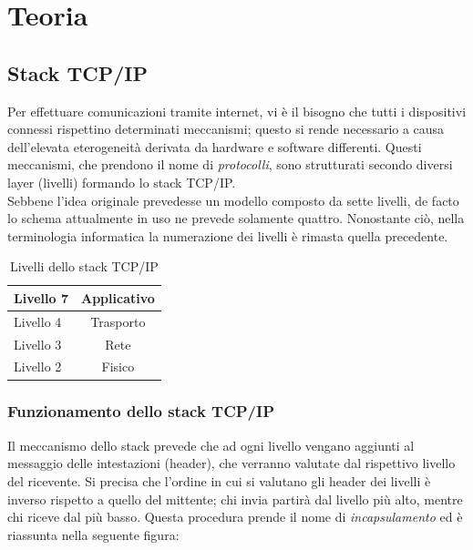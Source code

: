 \chapter{Teoria}

\section{Stack TCP/IP}
Per effettuare comunicazioni tramite internet, vi è il bisogno che tutti i dispositivi connessi rispettino determinati meccanismi; questo si rende necessario a causa dell'elevata eterogeneità derivata da hardware e software differenti.
Questi meccanismi, che prendono il nome di \textit{protocolli}, sono strutturati secondo diversi layer (livelli) formando lo stack TCP/IP.  \\
Sebbene l'idea originale prevedesse un modello composto da sette livelli, de facto lo schema attualmente in uso ne prevede solamente quattro. Nonostante ciò, nella terminologia informatica la numerazione dei livelli è rimasta quella precedente.
\\
\begin{table}[htb]
	\centering
	\begin{tabular}{| l | c |}
		\hline
		Livello 7 & Applicativo
		\\
		\hline
		Livello 4 & Trasporto
		\\
		\hline
		Livello 3 & Rete
		\\
		\hline
		Livello 2 & Fisico
		\\
		\hline
		
	\end{tabular}
	\caption{Livelli dello stack TCP/IP}
	\label{tab:stack}
\end{table}

\subsection{Funzionamento dello stack TCP/IP}
Il meccanismo dello stack prevede che ad ogni livello vengano aggiunti al messaggio delle intestazioni (header), che verranno valutate dal rispettivo livello del ricevente.
Si precisa che l'ordine in cui si valutano gli header dei livelli è inverso rispetto a quello del mittente; chi invia partirà dal livello più alto, mentre chi riceve dal più basso.
Questa procedura prende il nome di \textit{incapsulamento} ed è riassunta nella seguente figura:



